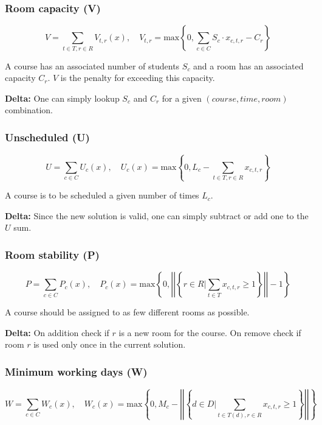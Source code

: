 \subsubsection{Room capacity (V)}
\begin{equation}
V = \sum_{t \in T, r \in R} V_{t, r}(x), \quad V_{t, r} = \mathrm{max}\left\{ 0, \sum_{c \in C} S_c \cdot x_{c, t, r} - C_r \right\}
\end{equation}

A course has an associated number of students $S_c$ and a room has an associated capacity $C_r$. $V$ is the penalty for exceeding this capacity.

\textbf{Delta: } One can simply lookup $S_c$ and $C_r$ for a given $(course, time, room)$ combination.

\subsubsection{Unscheduled (U)}
\begin{equation}
U = \sum_{c \in C} U_c(x), \quad U_c(x) = \mathrm{max}\left\{ 0, L_c - \sum_{t \in T, r \in R} x_{c, t, r}\right\}
\end{equation}

A course is to be scheduled a given number of times $L_c$.

\textbf{Delta: } Since the new solution is valid, one can simply subtract or add one to the $U$ sum.

\subsubsection{Room stability (P)}
\begin{equation}
P = \sum_{c \in C} P_c(x), \quad P_c(x) = \mathrm{max}\left\{ 0, \left|\left| \left\{ r \in R \Big\vert \sum_{t \in T} x_{c, t, r} \ge 1 \right\} \right|\right| - 1 \right\}
\end{equation}

A course should be assigned to as few different rooms as possible.

\textbf{Delta: } On addition check if $r$ is a new room for the course. On remove check if room $r$ is used only once in the current solution.

\subsubsection{Minimum working days (W)}
\begin{equation*}
W = \sum_{c \in C} W_c(x), \quad W_c(x) = \mathrm{max}\left\{ 0, M_c - \left|\left| \left\{ d \in D \Big\vert \sum_{t \in T(d), r \in R} x_{c, t, r} \ge 1 \right\} \right|\right| \right\}
\end{equation*}

